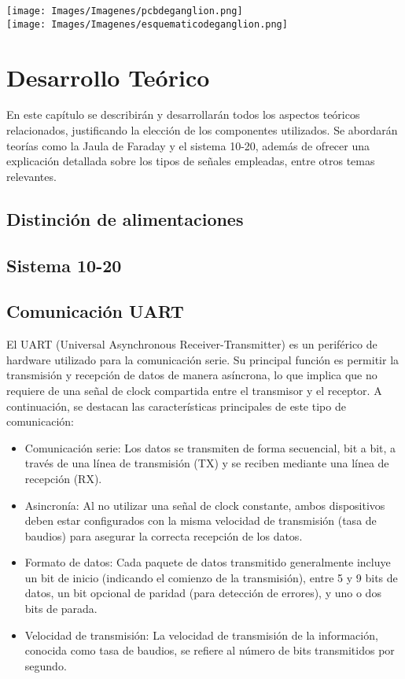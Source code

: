 \documentclass{article}
\begin{document}
\begin{center}
    \texttt{[image: Images/Imagenes/pcbdeganglion.png]}\\

    \texttt{[image: Images/Imagenes/esquematicodeganglion.png]}\\
\end {center}

\section{Desarrollo Teórico}
En este capítulo se describirán y desarrollarán todos los aspectos teóricos relacionados, justificando la elección de los componentes utilizados. Se abordarán teorías como la Jaula de Faraday y el sistema 10-20, además de ofrecer una explicación detallada sobre los tipos de señales empleadas, entre otros temas relevantes.

\subsection{Distinción de alimentaciones}

\subsection{Sistema 10-20}

\subsection{Comunicación UART}

El UART (Universal Asynchronous Receiver-Transmitter) es un periférico de hardware utilizado para la comunicación serie. Su principal función es permitir la transmisión y recepción de datos de manera asíncrona, lo que implica que no requiere de una señal de clock compartida entre el transmisor y el receptor. A continuación, se destacan las características principales de este tipo de comunicación:

\begin{itemize}
    \item Comunicación serie: Los datos se transmiten de forma secuencial, bit a bit, a través de una línea de transmisión (TX) y se reciben mediante una línea de recepción (RX).
    \item Asincronía: Al no utilizar una señal de clock constante, ambos dispositivos deben estar configurados con la misma velocidad de transmisión (tasa de baudios) para asegurar la correcta recepción de los datos.
    \item Formato de datos: Cada paquete de datos transmitido generalmente incluye un bit de inicio (indicando el comienzo de la transmisión), entre 5 y 9 bits de datos, un bit opcional de paridad (para detección de errores), y uno o dos bits de parada.
    \item Velocidad de transmisión: La velocidad de transmisión de la información, conocida como tasa de baudios, se refiere al número de bits transmitidos por segundo.
\end{itemize}
\end{document}
